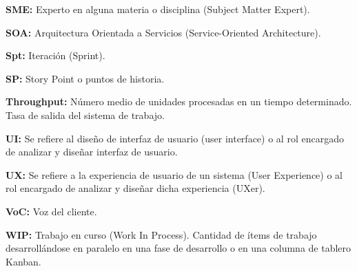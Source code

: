 \begin{description}
  \item {\textbf{SME:} Experto en alguna materia o disciplina (Subject Matter Expert).}
   
  \item {\textbf{SOA:} Arquitectura Orientada a Servicios (Service-Oriented Architecture).}
  
  \item {\textbf{Spt:} Iteración (Sprint).}
  
  \item {\textbf{SP:} Story Point o puntos de historia.}
  
 \item {\textbf{Throughput:} Número medio de unidades procesadas en un tiempo determinado. Tasa de salida del sistema de trabajo.}
  
  \item {\textbf{UI:} Se refiere al diseño de interfaz de usuario (user interface) o al rol encargado de analizar y diseñar interfaz de usuario.}
  
    \item {\textbf{UX:} Se refiere a la experiencia de usuario de un sistema (User Experience) o al rol encargado de analizar y diseñar dicha experiencia (UXer).}
    
  \item {\textbf{VoC:} Voz del cliente.}
  
  \item {\textbf{WIP:} Trabajo en curso (Work In Process). Cantidad de ítems de trabajo desarrollándose en paralelo en una fase de desarrollo o en una columna de tablero Kanban.}
  
    
\end{description}
  
